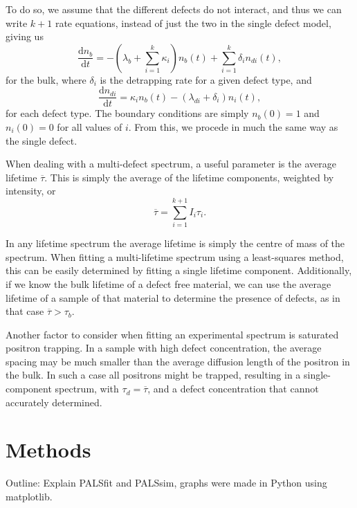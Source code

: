 To do so, we assume that the different defects do not interact, and thus we can write $k+1$ rate equations, instead of just the two in the single defect model, giving us
\begin{equation}
    \dfrac{\mathrm{d}n_b}{\mathrm{d}t} = -\left(\lambda_b + \sum_{i=1}^{k} \kappa_i\right)n_b(t) + \sum_{i=1}^{k} \delta_i n_{di}(t),
\end{equation}
for the bulk, where $\delta_i$ is the detrapping rate for a given defect type, and
\begin{equation}
    \dfrac{\mathrm{d}n_{di}}{\mathrm{d}t} = \kappa_i n_b(t) - (\lambda_{di} + \delta_i) n_i(t),
\end{equation}
for each defect type. The boundary conditions are simply $n_b(0)=1$ and $n_i(0)=0$ for all values of $i$. From this, we procede in much the same way as the single defect.

When dealing with a multi-defect spectrum, a useful parameter is the average lifetime $\overline{\tau}$. This is simply the average of the lifetime components, weighted by intensity, or
\begin{equation}
    \overline{\tau} = \sum_{i=1}^{k+1} I_i \tau_i.
\end{equation}

In any lifetime spectrum the average lifetime is simply the centre of mass of the spectrum. When fitting a multi-lifetime spectrum using a least-squares method, this can be easily determined by fitting a single lifetime component. Additionally, if we know the bulk lifetime of a defect free material, we can use the average lifetime of a sample of that material to determine the presence of defects, as in that case $\overline{\tau} > \tau_b$.

Another factor to consider when fitting an experimental spectrum is saturated positron trapping. In a sample with high defect concentration, the average spacing may be much smaller than the average diffusion length of the positron in the bulk. In such a case all positrons might be trapped, resulting in a single-component spectrum, with $\tau_d = \overline{\tau}$, and a defect concentration that cannot accurately determined.

\chapter{Methods}

Outline: Explain PALSfit and PALSsim, graphs were made in Python using matplotlib.
